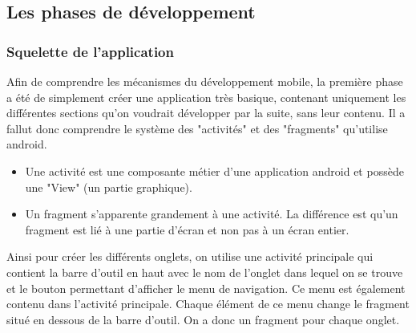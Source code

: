 \documentclass{article}
\begin{document}
\subsection{Les phases de développement}
\subsubsection{Squelette de l'application}
Afin de comprendre les mécanismes du développement mobile, la première phase a été de simplement créer une application très basique, contenant
uniquement les différentes sections qu'on voudrait développer par la suite, sans leur contenu. Il a fallut donc comprendre le système des 
"activités" et des "fragments" qu'utilise android.
\begin{itemize}
  \item Une activité est une composante métier d'une application android et possède une "View" (un partie graphique).
  \item Un fragment s'apparente grandement à une activité. La différence est qu'un fragment est lié à une partie d'écran et non pas à un écran entier. 
\end{itemize}
Ainsi pour créer les différents onglets, on utilise une activité principale qui contient la barre d'outil en haut avec le nom de l'onglet
dans lequel on se trouve et le bouton permettant d'afficher le menu de navigation. Ce menu est également contenu dans l'activité principale.
Chaque élément de ce menu change le fragment situé en dessous de la barre d'outil. On a donc un fragment pour chaque onglet. 
\end{document}
